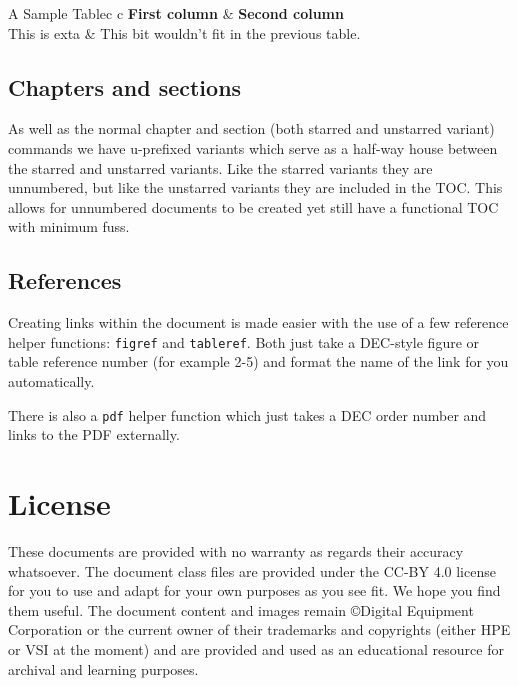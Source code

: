 \documentclass{decsectional}
\begin{document}
\begin{tblcont}{A Sample Table}{c c}
\textbf{First column} & \textbf{Second column} \\
\hline
This is exta & This bit wouldn't fit in the previous table.\\
\end{tblcont}

\section{Chapters and sections}

As well as the normal chapter and section (both starred and unstarred variant) commands we have u-prefixed 
variants which serve as a half-way house between the starred and unstarred variants. Like the starred variants
they are unnumbered, but like the unstarred variants they are included in the TOC. This allows for unnumbered
documents to be created yet still have a functional TOC with minimum fuss.



\section{References}

Creating links within the document is made easier with the use of a few reference helper functions: \texttt{figref} and
\texttt{tableref}.  Both just take a DEC-style figure or table reference number (for example 2-5) and format the
name of the link for you automatically.

There is also a \texttt{pdf} helper function which just takes a DEC order number and links to the PDF externally.







\chapter{License}

These documents are provided with no warranty as regards their accuracy whatsoever. The document class files are provided under the CC-BY 4.0 license
for you to use and adapt for your own purposes as you see fit. We hope you find them useful. The document content and images remain \copyright Digital
Equipment Corporation or the current owner of their trademarks and copyrights (either HPE or VSI at the moment) and are provided and used as an educational
resource for archival and learning purposes.
\end{document}

